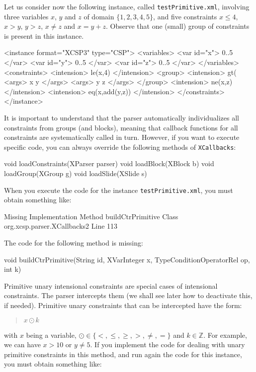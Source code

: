 \documentclass[10pt]{article}
\newenvironment{boxabsc}
               {\medskip \begin{bclogo}[barre=none,arrondi=0.2,logo=]{}\vspace{-0.6cm}}
               {\vspace{-0.1cm}\end{bclogo} \smallskip}
\newcommand{\nn}[1]{{\tt #1}} %
\begin{document}
Let us consider now the following instance, called \nn{testPrimitive.xml}, involving three variables $x$, $y$ and $z$ of domain $\{1,2,3,4,5\}$, and five constraints $x\leq 4$, $x > y$, $y > z$, $x \neq z$ and $x = y+z$.
Observe that one (small) group of constraints is present in this instance.

\begin{boxabsc}
\begin{absc}
<instance format="XCSP3" type="CSP">
  <variables>
    <var id="x"> 0..5 </var>
    <var id="y"> 0..5 </var>
    <var id="z"> 0..5 </var>
  </variables>
  <constraints>
    <intension> le(x,4) </intension>
    <group>
      <intension> gt(%
      <args> x y </args>
      <args> y z </args>
    </group>
    <intension> ne(x,z) </intension>
    <intension> eq(x,add(y,z)) </intension>
  </constraints>
</instance>
\end{absc} 
\end{boxabsc}

It is important to understand that the parser automatically individualizes all constraints from groups (and blocks), meaning that callback functions for all constraints are systematically called in turn.
However, if you want to execute specific code, you can always override the following methods of \nn{XCallbacks}:
\begin{absc}
void loadConstraints(XParser parser)
void loadBlock(XBlock b)
void loadGroup(XGroup g)
void loadSlide(XSlide s)
\end{absc} 


When you execute the code for the instance \nn{testPrimitive.xml}, you must obtain something like:

\begin{boxabsc}
\begin{void}
Missing Implementation
  Method buildCtrPrimitive
  Class org.xcsp.parser.XCallbacks2
  Line 113
\end{void} 
\end{boxabsc}

The code for the following method is missing:

\begin{boxabsc}
\begin{absc}
void buildCtrPrimitive(String id, XVarInteger x, TypeConditionOperatorRel op, int k) 
\end{absc} 
\end{boxabsc}

Primitive unary intensional constraints are special cases of intensional constraints.
The parser intercepts them (we shall see later how to deactivate this, if needed).
Primitive unary constraints that can be intercepted have the form:
\begin{quote}
$x \odot k$
\end{quote}
with $x$ being a variable, $\odot \in \{<,\leq,\geq,>,\neq,=\}$ and $k \in \mathbb{Z}$.
For example, we can have $x > 10$ or $y \neq 5$.
If you implement the code for dealing with unary primitive constraints in this method, and run again the code for this instance, you must obtain something like:
\end{document}
